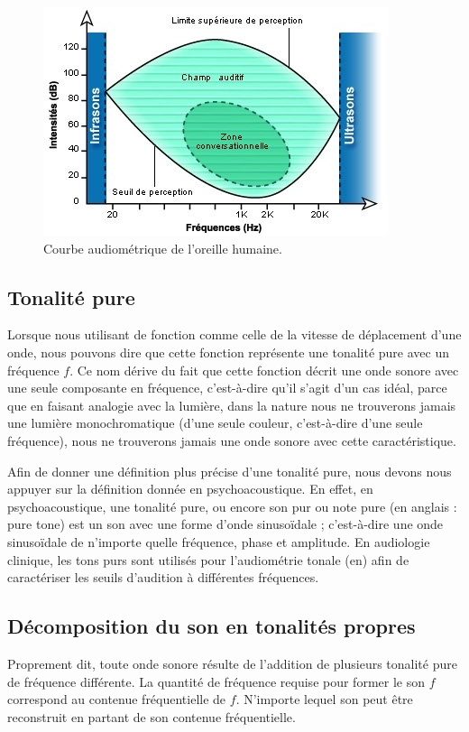 \documentclass[conference,onecolumn]{IEEEtran}
\begin{document}
 \begin{figure}[H]
 \centering
    \includegraphics[scale=1.5]{img3.jpg}
    \caption{Courbe audiométrique de l'oreille humaine.}
\end{figure}

 \subsection{Tonalité pure}
 Lorsque nous utilisant de fonction comme celle de la vitesse de déplacement d’une onde, nous pouvons dire que cette fonction représente une tonalité pure avec un fréquence $f$. Ce nom dérive du fait que cette fonction décrit une onde sonore avec une seule composante en fréquence, c’est-à-dire qu’il s’agit d’un cas idéal, parce que en faisant analogie avec la lumière, dans la nature nous ne trouverons jamais une lumière monochromatique (d’une seule couleur, c’est-à-dire d’une seule fréquence), nous ne trouverons jamais une onde sonore avec cette caractéristique.  

Afin de donner une définition plus précise d’une tonalité pure, nous devons nous appuyer sur la définition donnée en psychoacoustique. En effet, en psychoacoustique, une tonalité pure, ou encore son pur ou note pure (en anglais : pure tone) est un son avec une forme d'onde sinusoïdale ; c'est-à-dire une onde sinusoïdale de n'importe quelle fréquence, phase et amplitude. En audiologie clinique, les tons purs sont utilisés pour l'audiométrie tonale (en) afin de caractériser les seuils d'audition à différentes fréquences. 

\subsection{Décomposition du son en tonalités propres}
Proprement dit, toute onde sonore résulte de l’addition de plusieurs tonalité pure de fréquence différente. La quantité de fréquence requise pour former le son $f$ correspond au contenue fréquentielle de $f$. N’importe lequel son peut être reconstruit en partant de son contenue fréquentielle. 
\end{document}
